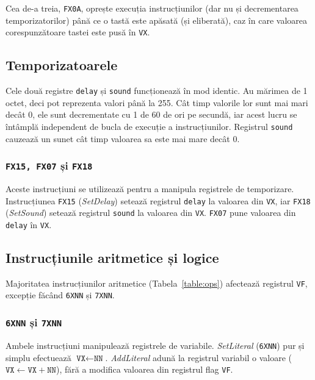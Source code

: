 \documentclass[a4paper]{article}
\begin{document}
Cea de-a treia, \texttt{FX0A}, oprește execuția instrucțiunilor (dar nu și decrementarea temporizatorilor) până ce o tastă este apăsată (și eliberată),
caz în care valoarea corespunzătoare tastei este pusă în \texttt{VX}.

\subsection{Temporizatoarele}
Cele două registre \texttt{delay} și \texttt{sound} funcționează în mod identic. Au mărimea de 1 octet, deci pot reprezenta valori până la 255.
Cât timp valorile lor sunt mai mari decât 0, ele sunt decrementate cu 1 de 60 de ori pe secundă, iar acest lucru se întâmplă independent
de bucla de execuție a instrucțiunilor.
Registrul \texttt{sound} cauzează un sunet cât timp valoarea sa este mai mare decât 0.

\subsubsection{\texttt{FX15, FX07} și \texttt{FX18}}
Aceste instrucțiuni se utilizează pentru a manipula registrele de temporizare. Instrucțiunea \texttt{FX15} (\textit{SetDelay}) setează registrul
\texttt{delay} la valoarea din \texttt{VX}, iar \texttt{FX18} (\textit{SetSound}) setează registrul \texttt{sound} la valoarea din \texttt{VX}.
\texttt{FX07} pune valoarea din \texttt{delay} în \texttt{VX}.

\subsection{Instrucțiunile aritmetice și logice}
Majoritatea instrucțiunilor aritmetice (Tabela~\ref{table:ops}) afectează registrul \texttt{VF}, excepție făcând \texttt{6XNN} și \texttt{7XNN}.

\subsubsection{\texttt{6XNN} și \texttt{7XNN}}
Ambele instrucțiuni manipulează registrele de variabile. \textit{SetLiteral} (\texttt{6XNN}) pur și simplu efectuează $\texttt{VX} \gets \texttt{NN}$.
\textit{AddLiteral} adună la registrul variabil o valoare ($\texttt{VX} \gets \texttt{VX} + \texttt{NN}$), fără a modifica valoarea din registrul flag
\texttt{VF}.
\end{document}
